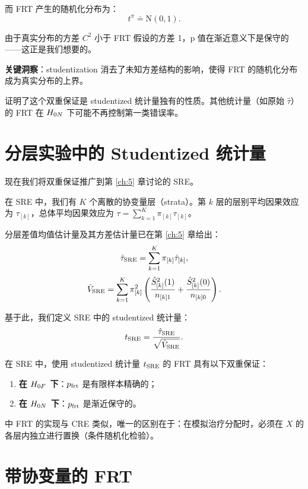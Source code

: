 而 FRT 产生的随机化分布为：
\[
t^\pi \doteq \mathrm{N}(0, 1) .
\label{eq:8-t-pi}
\]

由于真实分布的方差 $C^2$ 小于 FRT 假设的方差 1，p 值在渐近意义下是保守的——这正是我们想要的。

\textbf{关键洞察}：studentization 消去了未知方差结构的影响，使得 FRT 的随机化分布成为真实分布的上界。

\begin{Remark}
\citet{DingDasgupta:2017} 证明了这个双重保证是 studentized 统计量独有的性质。其他统计量（如原始 $\hat\tau$）的 FRT 在 $H_{0N}$ 下可能不再控制第一类错误率。
\end{Remark}

\section{分层实验中的 Studentized 统计量}
\label{sec:8-sre-studentized}

现在我们将双重保证推广到第 \ref{ch:5} 章讨论的 SRE。

在 SRE 中，我们有 $K$ 个离散的协变量层（strata）。第 $k$ 层的层别平均因果效应为 $\tau_{[k]}$，总体平均因果效应为 $\tau = \sum_{k=1}^K \pi_{[k]} \tau_{[k]}$。

分层差值均值估计量及其方差估计量已在第 \ref{ch:5} 章给出：
\[
\hat\tau_{\text{SRE}} = \sum_{k=1}^K \pi_{[k]} \hat\tau_{[k]} ,
\label{eq:8-sre-estimator}
\]
\[
\hat V_{\text{SRE}} = \sum_{k=1}^K \pi_{[k]}^2 \left( \frac{\hat S_{[k]}^2(1)}{n_{[k]1}} + \frac{\hat S_{[k]}^2(0)}{n_{[k]0}} \right) .
\label{eq:8-sre-variance}
\]

基于此，我们定义 SRE 中的 studentized 统计量：
\[
t_{\text{SRE}} = \frac{\hat\tau_{\text{SRE}}}{\sqrt{\hat V_{\text{SRE}}}} .
\label{eq:8-sre-studentized}
\]

\begin{Theorem}\label{th:8-sre-dual-guarantee}
在 SRE 中，使用 studentized 统计量 $t_{\text{SRE}}$ 的 FRT 具有以下双重保证：
\begin{enumerate}
  \item \textbf{在 $H_{0F}$ 下}：$p_{\text{frt}}$ 是有限样本精确的；
  \item \textbf{在 $H_{0N}$ 下}：$p_{\text{frt}}$ 是渐近保守的。
\end{enumerate}
\end{Theorem}

\SRE 中 FRT 的实现与 CRE 类似，唯一的区别在于：在模拟治疗分配时，必须在 $X$ 的各层内独立进行置换（条件随机化检验）。

\section{带协变量的 FRT}
\label{sec:8-covariate-frt}

